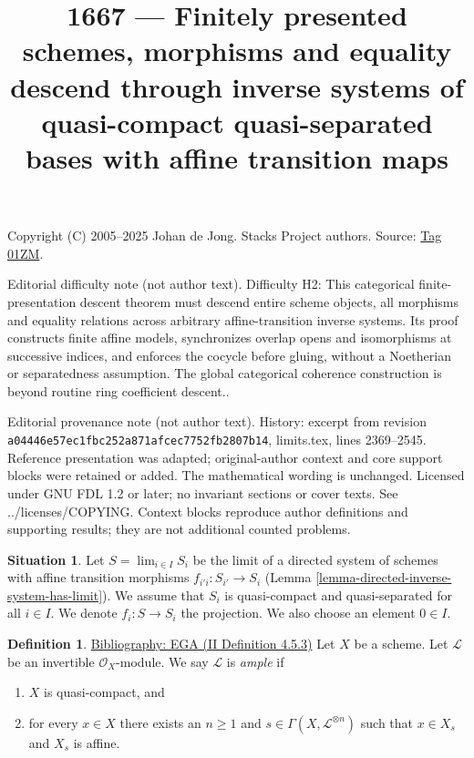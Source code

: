 \documentclass{amsart}
\newenvironment{reference}{\comment}{\endcomment}
\theoremstyle{plain}
\theoremstyle{definition}
\newtheorem{definition}[subsection]{Definition}
\newtheorem{situation}[subsection]{Situation}
\theoremstyle{remark}
\numberwithin{equation}{subsection}
\def\lim{\mathop{\mathrm{lim}}\nolimits}
\begin{document}
\title[Stacks Project, Tag 01ZM]{1667 --- Finitely presented schemes, morphisms and equality descend through inverse systems of quasi-compact quasi-separated bases with affine transition maps}
\maketitle
\noindent Copyright (C) 2005--2025 Johan de Jong. Stacks Project authors. Source: \href{https://stacks.math.columbia.edu/tag/01ZM}{Tag 01ZM}.

\noindent Editorial difficulty note (not author text). Difficulty H2: This categorical finite-presentation descent theorem must descend entire scheme objects, all morphisms and equality relations across arbitrary affine-transition inverse systems. Its proof constructs finite affine models, synchronizes overlap opens and isomorphisms at successive indices, and enforces the cocycle before gluing, without a Noetherian or separatedness assumption. The global categorical coherence construction is beyond routine ring coefficient descent..

\noindent Editorial provenance note (not author text). History: excerpt from revision \texttt{a0444\allowbreak 6e57e\allowbreak c1fbc\allowbreak 252a8\allowbreak 71afc\allowbreak ec775\allowbreak 2fb28\allowbreak 07b14}, limits.tex, lines 2369--2545. Reference presentation was adapted; original-author context and core support blocks were retained or added. The mathematical wording is unchanged. Licensed under GNU FDL 1.2 or later; no invariant sections or cover texts. See ../licenses/COPYING. Context blocks reproduce author definitions and supporting results; they are not additional counted problems.

\begin{situation}
\label{situation-descent}
Let $S = \lim_{i \in I} S_i$ be the limit of a directed system of schemes
with affine transition morphisms $f_{i'i} : S_{i'} \to S_i$
(Lemma \ref{lemma-directed-inverse-system-has-limit}).
We assume that $S_i$ is quasi-compact and quasi-separated for all $i \in I$.
We denote $f_i : S \to S_i$ the projection.
We also choose an element $0 \in I$.
\end{situation}

\begin{definition}
\label{properties-definition-ample}
\begin{reference}
\href{https://stacks.math.columbia.edu/bibliography}{Bibliography: EGA (II Definition 4.5.3)}
\end{reference}
Let $X$ be a scheme.
Let $\mathcal{L}$ be an invertible $\mathcal{O}_X$-module.
We say $\mathcal{L}$ is {\it ample} if
\begin{enumerate}
\item $X$ is quasi-compact, and
\item for every $x \in X$ there exists an $n \geq 1$
and $s \in \Gamma(X, \mathcal{L}^{\otimes n})$ such
that $x \in X_s$ and $X_s$ is affine.
\end{enumerate}
\end{definition}
\end{document}
